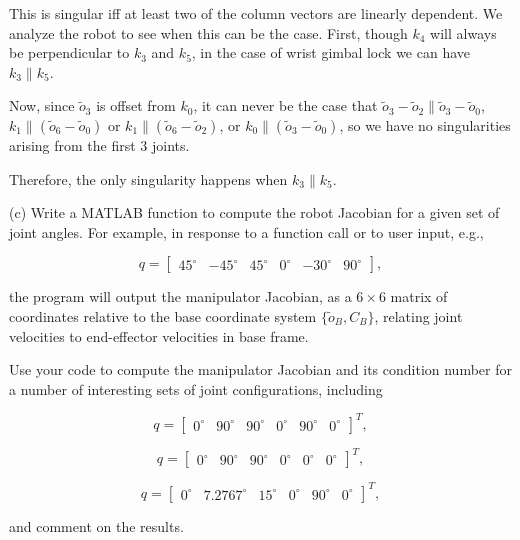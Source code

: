 \documentclass[11pt]{article}
\begin{document}
This is singular iff at least two of the column vectors are linearly dependent.
We analyze the robot to see when this can be the case.
First, though $k_4$ will always be perpendicular to $k_3$ and $k_5$, in the case of wrist gimbal lock we can have $k_3  \parallel k_5$.

Now, since $\tilde{o}_3$ is offset from $k_0$, it can never be the case that $\tilde{o}_{3} - \tilde{o}_{2} \parallel \tilde{o}_{3} - \tilde{o}_{0}$, $k_1 \parallel (\tilde{o}_6 - \tilde{o}_0)$ or $k_1 \parallel (\tilde{o}_6 - \tilde{o}_2)$, or $k_0 \parallel (\tilde{o}_3 - \tilde{o}_0)$, so we have no singularities arising from the first 3 joints.

Therefore, the only singularity happens when $k_3 \parallel k_5$.

\vspace{0.3cm}

\noindent
(c) Write a MATLAB function to compute the robot Jacobian for a given set of
joint angles. For example, in response to a function call or to user input, e.g.,

\[
q =
\begin{bmatrix}
45^\circ & -45^\circ & 45^\circ & 0^\circ & -30^\circ & 90^\circ
\end{bmatrix},
\]

the program will output the manipulator Jacobian, as a $6\times6$ matrix of
coordinates relative to the base coordinate system $\{\tilde{o}_B, C_B\}$,
relating joint velocities to end-effector velocities in base frame.

Use your code to compute the manipulator Jacobian and its condition number for a
number of interesting sets of joint configurations, including

\[
q =
\begin{bmatrix}
0^\circ & 90^\circ & 90^\circ & 0^\circ & 90^\circ & 0^\circ
\end{bmatrix}^T,
\]

\[
q =
\begin{bmatrix}
0^\circ & 90^\circ & 90^\circ & 0^\circ & 0^\circ & 0^\circ
\end{bmatrix}^T,
\]

\[
q =
\begin{bmatrix}
0^\circ & 7.2767^\circ & 15^\circ & 0^\circ & 90^\circ & 0^\circ
\end{bmatrix}^T,
\]

and comment on the results.

\vspace{0.3cm}
\end{document}

